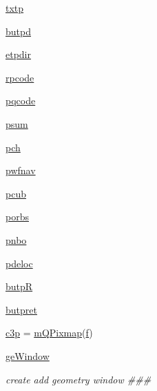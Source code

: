 \begin{DoxyCompactItemize}
\item 
\hyperlink{classmolSimplify_1_1Classes_1_1mGUI_1_1mGUI_adbb575f7bdf2cff5f6e68f5bb711e186}{txtp}
\item 
\hyperlink{classmolSimplify_1_1Classes_1_1mGUI_1_1mGUI_a82cde1bee8aa99b4f01e1968ab0105a2}{butpd}
\item 
\hyperlink{classmolSimplify_1_1Classes_1_1mGUI_1_1mGUI_a630547b4b8ac7a044be526ee1875f205}{etpdir}
\item 
\hyperlink{classmolSimplify_1_1Classes_1_1mGUI_1_1mGUI_a29a7b3d2102cff6bd3b36a1df2300b21}{rpcode}
\item 
\hyperlink{classmolSimplify_1_1Classes_1_1mGUI_1_1mGUI_a3498947f3118933cc804c75b08d1e967}{pqcode}
\item 
\hyperlink{classmolSimplify_1_1Classes_1_1mGUI_1_1mGUI_a3a27badf880578de3a36db8a87b8bd52}{psum}
\item 
\hyperlink{classmolSimplify_1_1Classes_1_1mGUI_1_1mGUI_ac956ca7641f0d19cb98490d5ef736b01}{pch}
\item 
\hyperlink{classmolSimplify_1_1Classes_1_1mGUI_1_1mGUI_ab14eec413f100f855c016e3fb78cc3d6}{pwfnav}
\item 
\hyperlink{classmolSimplify_1_1Classes_1_1mGUI_1_1mGUI_add894f2538ca3a3b92cc5db7a8544734}{pcub}
\item 
\hyperlink{classmolSimplify_1_1Classes_1_1mGUI_1_1mGUI_a9bb701f6349b3a6ff060a64dad0559d9}{porbs}
\item 
\hyperlink{classmolSimplify_1_1Classes_1_1mGUI_1_1mGUI_a2d30ef17c47667066aeb092b52167164}{pnbo}
\item 
\hyperlink{classmolSimplify_1_1Classes_1_1mGUI_1_1mGUI_aefc2f022f251bd1507142bfa12c206cc}{pdeloc}
\item 
\hyperlink{classmolSimplify_1_1Classes_1_1mGUI_1_1mGUI_aa6c8810af0baedb33f05675612ab85da}{butpR}
\item 
\hyperlink{classmolSimplify_1_1Classes_1_1mGUI_1_1mGUI_aadd819f4cdb34e4824aed97e70f6c207}{butpret}
\item 
\hyperlink{classmolSimplify_1_1Classes_1_1mGUI_1_1mGUI_a03917e2fb05952ae20a34cbcd7ddf0ba}{c3p} = \hyperlink{classmolSimplify_1_1Classes_1_1mWidgets_1_1mQPixmap}{m\+Q\+Pixmap}(\hyperlink{classmolSimplify_1_1Classes_1_1mGUI_1_1mGUI_a76137d1ef407b43266e051d20d866478}{f})
\item 
\hyperlink{classmolSimplify_1_1Classes_1_1mGUI_1_1mGUI_a04d08242aec1b9147e4f8864406002c5}{ge\+Window}
\begin{DoxyCompactList}\small\item\em create add geometry window \#\#\# \end{DoxyCompactList}\item 

\end{DoxyCompactItemize}
